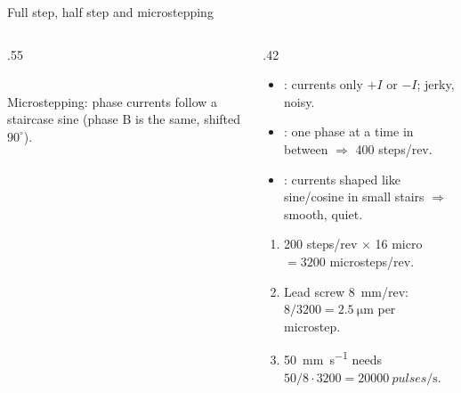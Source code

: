 \documentclass[aspectratio=169,10pt]{beamer}
\begin{document}
\begin{frame}{Full step, half step and microstepping}
\begin{columns}[T]
\begin{column}{.55\textwidth}
\\
{\scriptsize\color{mkGray} Microstepping: phase currents follow a staircase sine (phase B is the same, shifted $90^\circ$).}
\end{column}
\begin{column}{.42\textwidth}
\small
\begin{itemize}\setlength\itemsep{2pt}
\item {}: currents only $+I$ or $-I$; jerky, noisy.
\item {}: one phase at a time in between $\Rightarrow$ 400 steps/rev.
\item {}: currents shaped like sine/cosine in small stairs $\Rightarrow$ smooth, quiet.
\end{itemize}
\begin{defbox}
\small
\begin{enumerate}\setlength\itemsep{1pt}
\item 200 steps/rev $\times$ 16 micro $=3200$ microsteps/rev.
\item Lead screw \SI{8}{\milli\metre}/rev: $8/3200=\SI{2.5}{\micro\metre}$ per microstep.
\item \SI{50}{\milli\metre\per\second} needs $50/8\cdot3200=\SI{20000}{pulses\per\second}$.
\end{enumerate}
\end{defbox}
\end{column}
\end{columns}
\end{frame}
\end{document}
